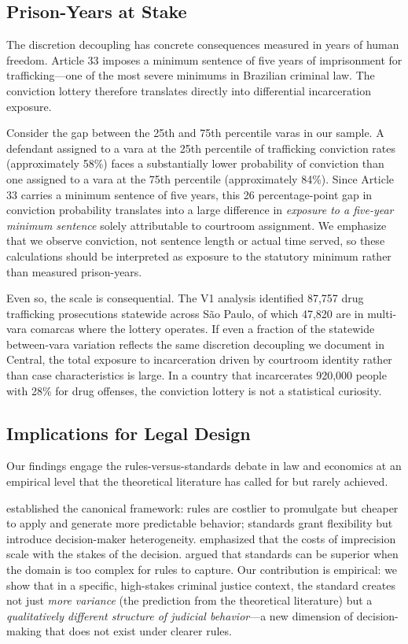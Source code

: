\documentclass[12pt]{article}
\begin{document}
\subsection{Prison-Years at Stake}

The discretion decoupling has concrete consequences measured in years of human freedom. Article 33 imposes a minimum sentence of five years of imprisonment for trafficking---one of the most severe minimums in Brazilian criminal law. The conviction lottery therefore translates directly into differential incarceration exposure.

Consider the gap between the 25th and 75th percentile varas in our sample. A defendant assigned to a vara at the 25th percentile of trafficking conviction rates (approximately 58\%) faces a substantially lower probability of conviction than one assigned to a vara at the 75th percentile (approximately 84\%). Since Article 33 carries a minimum sentence of five years, this 26 percentage-point gap in conviction probability translates into a large difference in \textit{exposure to a five-year minimum sentence} solely attributable to courtroom assignment. We emphasize that we observe conviction, not sentence length or actual time served, so these calculations should be interpreted as exposure to the statutory minimum rather than measured prison-years.

Even so, the scale is consequential. The V1 analysis identified 87,757 drug trafficking prosecutions statewide across S\~ao Paulo, of which 47,820 are in multi-vara comarcas where the lottery operates. If even a fraction of the statewide between-vara variation reflects the same discretion decoupling we document in Central, the total exposure to incarceration driven by courtroom identity rather than case characteristics is large. In a country that incarcerates 920,000 people with 28\% for drug offenses, the conviction lottery is not a statistical curiosity.

\subsection{Implications for Legal Design}

Our findings engage the rules-versus-standards debate in law and economics at an empirical level that the theoretical literature has called for but rarely achieved.

\citet{kaplow1992} established the canonical framework: rules are costlier to promulgate but cheaper to apply and generate more predictable behavior; standards grant flexibility but introduce decision-maker heterogeneity. \citet{ehrlich1974} emphasized that the costs of imprecision scale with the stakes of the decision. \citet{sunstein1995} argued that standards can be superior when the domain is too complex for rules to capture. Our contribution is empirical: we show that in a specific, high-stakes criminal justice context, the standard creates not just \textit{more variance} (the prediction from the theoretical literature) but a \textit{qualitatively different structure of judicial behavior}---a new dimension of decision-making that does not exist under clearer rules.
\end{document}
